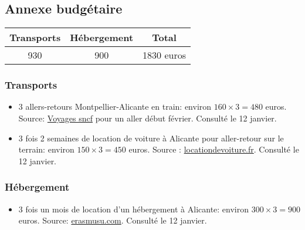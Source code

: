 \documentclass[12pt]{article} %
\begin{document}



\subsection{Annexe budgétaire}

\begin{tabular}{|c|c|c|}
\hline 
Transports & Hébergement & Total \\ 
\hline 
930 & 900 & 1830 euros \\ 
\hline 
\end{tabular} 


\subsubsection{Transports}

\begin{itemize}
\item 3 allers-retours Montpellier-Alicante en train: environ $160 \times 3 = 480$ euros. Source: \href{http://www.voyages-sncf.com}{Voyages sncf} pour un aller début février. Consulté le 12 janvier. 

\item 3 fois 2 semaines de location de voiture à Alicante pour aller-retour sur le terrain: environ $150 \times 3 = 450$ euros. Source : \href{https://www.locationdevoiture.fr/}{locationdevoiture.fr}. Consulté le 12 janvier.
\end{itemize}

\subsubsection{Hébergement}

\begin{itemize}
\item 3 fois un mois de location d'un hébergement à Alicante: environ $300 \times 3 = 900$ euros. Source:
\href{http://erasmusu.com/fr/erasmus-alicante/logement-etudiant}{erasmusu.com}. Consulté le 12 janvier.
\end{itemize}
\end{document}
